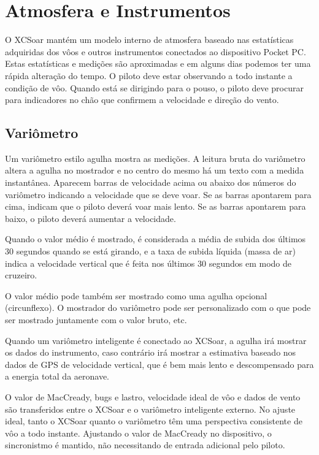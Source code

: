 \chapter{Atmosfera e Instrumentos}\label{cha:atmosph}
O XCSoar mantém um modelo interno de atmosfera baseado nas estatísticas adquiridas dos vôos e outros instrumentos conectados ao dispositivo Pocket PC.  Estas estatísticas e medições são aproximadas e em alguns dias podemos ter uma rápida alteração do tempo.  O piloto deve estar observando a todo instante a condição de vôo.  Quando está se dirigindo para o pouso, o piloto deve procurar para indicadores no chão que confirmem a velocidade e direção do vento.

\section{Variômetro}\label{sec:variometer}

Um variômetro estilo agulha mostra as medições.  A leitura bruta do variômetro altera a agulha no mostrador e no centro do mesmo há um texto com a medida instantânea.  Aparecem barras de velocidade acima ou abaixo dos números do variômetro indicando a velocidade que se deve voar.  Se as barras apontarem para cima, indicam que o piloto deverá voar mais lento.  Se as barras apontarem para baixo, o piloto deverá aumentar a velocidade.

Quando o valor médio é mostrado, é considerada a média de subida dos últimos 30 segundos quando se está girando, e a taxa de subida líquida (massa de ar) indica a velocidade vertical que é feita nos últimos 30 segundos em modo de cruzeiro.



O valor médio pode também ser mostrado como uma agulha opcional (circunflexo).  O mostrador do variômetro pode ser personalizado  com o que pode ser mostrado juntamente com o valor bruto, etc.

Quando um variômetro inteligente é conectado ao XCSoar, a agulha irá mostrar os dados do instrumento, caso contrário irá mostrar a estimativa baseado nos dados de GPS de velocidade vertical, que é bem mais lento e descompensado para a energia total da aeronave.

O valor de MacCready, bugs e lastro, velocidade ideal de vôo e dados de vento são transferidos entre o XCSoar e o variômetro inteligente externo.  No ajuste ideal, tanto o XCSoar quanto o variômetro têm uma perspectiva consistente de vôo a todo instante.  Ajustando o valor de MacCready no dispositivo, o sincronistmo é mantido, não necessitando de entrada adicional pelo piloto.


